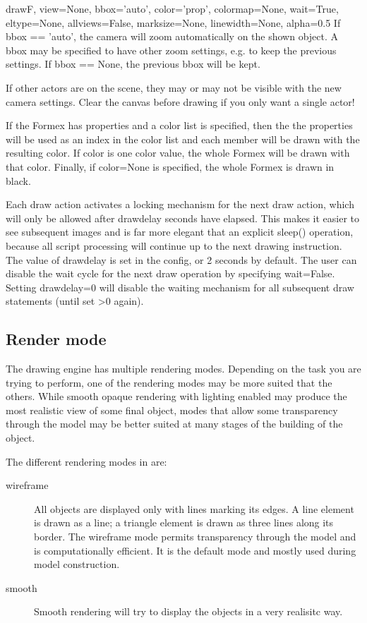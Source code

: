 {{{\begin{funcdesc}{draw}{F, view=None, bbox='auto', color='prop', colormap=None, wait=True, eltype=None, allviews=False, marksize=None, linewidth=None, alpha=0.5}
    If bbox == 'auto', the camera will zoom automatically on the shown
    object. A bbox may be specified to have other zoom settings, e.g. to
    keep the previous settings. If bbox == None, the previous bbox will be
    kept.

    If other actors are on the scene, they may or may not be visible with the
    new camera settings. Clear the canvas before drawing if you only want
    a single actor!

    If the Formex has properties and a color list is specified, then the
    the properties will be used as an index in the color list and each member
    will be drawn with the resulting color.
    If color is one color value, the whole Formex will be drawn with
    that color.
    Finally, if color=None is specified, the whole Formex is drawn in black.
    
    Each draw action activates a locking mechanism for the next draw action,
    which will only be allowed after drawdelay seconds have elapsed. This
    makes it easier to see subsequent images and is far more elegant that an
    explicit sleep() operation, because all script processing will continue
    up to the next drawing instruction.
    The value of drawdelay is set in the config, or 2 seconds by default.
    The user can disable the wait cycle for the next draw operation by
    specifying wait=False. Setting drawdelay=0 will disable the waiting
    mechanism for all subsequent draw statements (until set >0 again).

\end{funcdesc}

\subsection{Render mode}

The \pyformex drawing engine has multiple rendering modes. Depending on the task you are trying to perform, one of the rendering modes may be more suited that the others. While smooth opaque rendering with lighting enabled may produce the most realistic view of some final object, modes that allow some transparency through the model may be better suited at many stages of the building of the object.

The different rendering modes in \pyformex are:
\begin{description}
  \item[wireframe] All objects are displayed only with lines marking its edges. A line element is drawn as a line; a triangle element is drawn as three lines along its border. The wireframe mode permits transparency through the model and is computationally efficient. It is the default mode and mostly used during model construction.
  \item[smooth] Smooth rendering will try to display the objects in a very realisitc way. 
\end{description}


}}}
